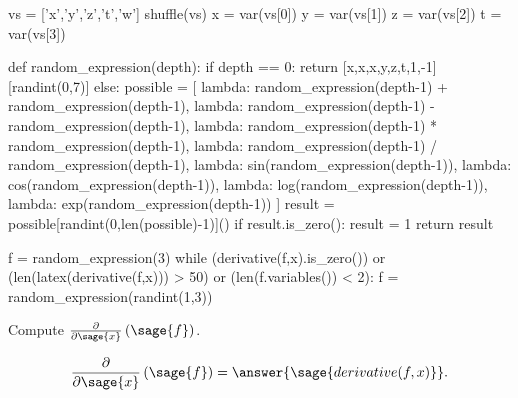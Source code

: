 \documentclass{ximera}
\author{Jim Fowler}
\begin{document}
\makerandom

\begin{sagesilent}
  vs = ['x','y','z','t','w']
  shuffle(vs)
  x = var(vs[0])
  y = var(vs[1])
  z = var(vs[2])
  t = var(vs[3])  

  def random_expression(depth):
    if depth == 0:
      return [x,x,x,y,z,t,1,-1][randint(0,7)]
    else:
      possible = [
        lambda: random_expression(depth-1) + random_expression(depth-1),
        lambda: random_expression(depth-1) - random_expression(depth-1),
        lambda: random_expression(depth-1) * random_expression(depth-1),
        lambda: random_expression(depth-1) / random_expression(depth-1),
        lambda: sin(random_expression(depth-1)),
        lambda: cos(random_expression(depth-1)),
        lambda: log(random_expression(depth-1)),
        lambda: exp(random_expression(depth-1))
      ]
      result = possible[randint(0,len(possible)-1)]()
      if result.is_zero():
        result = 1
      return result

  f = random_expression(3)
  while (derivative(f,x).is_zero()) or (len(latex(derivative(f,x))) > 50) or (len(f.variables()) < 2):
    f = random_expression(randint(1,3))
  
\end{sagesilent}

\begin{exercise}

  Compute $\frac{\partial}{\partial\sage{x}} \left( \sage{f} \right)$.

  \begin{prompt}
    \[
      \frac{\partial}{\partial\sage{x}} \left( \sage{f} \right) = \answer{\sage{derivative(f,x)}}.
    \]
  \end{prompt}
  
\end{exercise}
\end{document}
